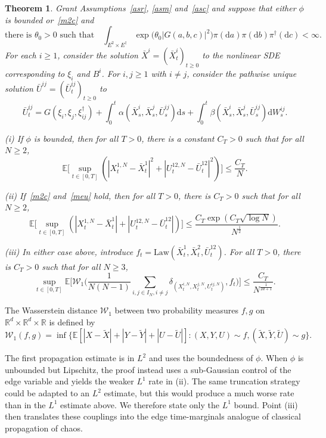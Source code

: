 \documentclass{amsart}
\newtheorem{thm}{Theorem}
\newcommand{\rr}{{\mathbb{R}}}
\newcommand{\cW}{{\mathcal{W}}}
\newcommand{\E}{\mathbb{E}}
\newcommand{\bX}{\bar X}
\newcommand{\bU}{\bar U}
\newcommand{\tX}{\tilde X}
\newcommand{\tY}{\tilde Y}
\newcommand{\tU}{\tilde U}
\newcommand{\vmark}{\xi}
\newcommand{\emark}{\vmark^\dagger}
\newcommand{\pmark}{a}
\newcommand{\qmark}{b}
\newcommand{\rmark}{c}
\newcommand{\vmarkspace}{E}
\newcommand{\vmarklaw}{\pi}
\newcommand{\emarkspace}{\vmarkspace^\dagger}
\newcommand{\emarklaw}{\vmarklaw^\dagger}
\newcommand{\dd}{{\mathrm{d}}}
\begin{document}
\begin{thm}\label{mr2}
Grant Assumptions~\ref{asr}, \ref{asm} and~\ref{asc} and suppose that either
$\phi$ is bounded or~\eqref{m2c} and
\begin{equation}\label{meu}
\text{there is $\theta_0>0$ such that}\quad
\int_{\vmarkspace^2\times \emarkspace}
\exp\big(\theta_0 |G(\pmark,\qmark,\rmark)|^2\big)
\vmarklaw(\dd \pmark) \vmarklaw(\dd \qmark)
\emarklaw(\dd \rmark)<\infty.
\end{equation}
For each $i\geq 1$, consider the solution $\bX^i=(\bX^i_t)_{t\geq 0}$ to the nonlinear SDE corresponding to
$\vmark_i$ and $B^i$. For $i,j\geq 1$ with $i\neq j$, consider the pathwise unique solution $\bU^{ij}=(\bU^{ij}_t)_{t\geq 0}$ to
\begin{equation}\label{dfg2}
\bU^{ij}_t=G(\vmark_i,\vmark_j ,\emark_{ij})
+ \int_0^t \alpha(\bX^i_s,\bX^j_s,\bU^{ij}_s)\dd s + \int_0^t \beta(\bX^i_s,\bX^j_s,\bU^{ij}_s)\dd W_s^{ij}.
\end{equation}

(i) If $\phi$ is bounded, then for all $T>0$, there is a constant $C_T>0$ such that
for all $N\geq 2$,
$$
\E\Big[\sup_{t\in[0,T]}(|X^{1,N}_t-\bX^1_t|^2+|U^{12,N}_t-\bU^{12}_t|^2)\Big] \leq \frac{C_T}N.
$$

(ii) If~\eqref{m2c} and~\eqref{meu} hold, then
for all $T>0$, there is  $C_{T}>0$ such that
for all $N\geq 2$,
$$
\E\Big[\sup_{t\in[0,T]}(|X^{1,N}_t-\bX^1_t|+|U^{12,N}_t-\bU^{12}_t|)\Big] \leq \frac{C_T\exp(C_T\sqrt{\log N})}{N^{\frac 12}}.
$$

(iii) In either case above, introduce
$f_t=\mathrm{Law}(\bX^1_t,\bX^2_t,\bU^{12}_t)$.
For all $T>0$, there is  $C_T>0$ such that for all $N\geq 3$,
$$
\sup_{t\in [0,T]}\E\Big[\cW_1\Big(\frac1{N(N-1)}\sum_{i,j \in I_N,i\neq j}\delta_{(X^{i,N}_t,X^{j,N}_t,U^{ij,N}_t)},f_t\Big)\Big]
\leq \frac{C_T}{N^{\frac 1{2d+1}}}.
$$
\end{thm}

The Wasserstein distance $\cW_1$ between two probability measures $f,g$ on $\rr^d\times\rr^d\times \rr$ is defined
by
$$
\cW_1(f,g)=\inf\Big\{\E[|X-\tX|+|Y-\tY|+|U-\tU|] : (X,Y,U)\sim f, (\tX,\tY,\tU)\sim g\Big\}.
$$

The first propagation estimate is in $L^2$ and uses the boundedness of $\phi$.
When $\phi$ is unbounded but Lipschitz, the proof instead uses a
sub-Gaussian control of the edge variable and yields the weaker $L^1$ rate in
(ii). The same truncation strategy could be adapted
to an $L^2$ estimate, but this would produce a much
worse rate than in the $L^1$ estimate above. We therefore state
only the $L^1$ bound.
Point (iii) then translates these couplings into the
edge time-marginals analogue of classical propagation of chaos.
\end{document}
